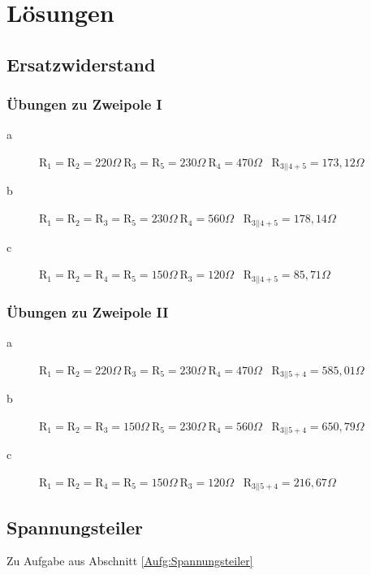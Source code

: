 \appendix
\section{Lösungen}
\subsection{Ersatzwiderstand}
\label{lsg:Ersatzwiderstand}
\subsubsection{Übungen zu Zweipole I}
\begin{description}
  \item[a] $\text{R}_1 = \text{R}_2 = 220 \Omega \ \text{R}_3 = \text{R}_5 = 230 \Omega \ \text{R}_4 = 470 \Omega$ \ $\text{R}_{3||4+5} = 173,12 \Omega$
  \item[b] $\text{R}_1 = \text{R}_2 = \text{R}_3 = \text{R}_5 = 230 \Omega \ \text{R}_4 = 560 \Omega$ \ $\text{R}_{3||4+5} = 178,14 \Omega$
  \item[c] $\text{R}_1 = \text{R}_2 = \text{R}_4 = \text{R}_5 = 150 \Omega \ \text{R}_3 = 120 \Omega$ \ $\text{R}_{3||4+5} = 85,71 \Omega$
\end{description}
\subsubsection{Übungen zu Zweipole II}
\begin{description}
  \item[a] $\text{R}_1 = \text{R}_2 = 220 \Omega \ \text{R}_3 = \text{R}_5 = 230 \Omega \ \text{R}_4 = 470 \Omega$ \ $\text{R}_{3||5+4} = 585,01 \Omega$
  \item[b] $\text{R}_1 = \text{R}_2 = \text{R}_3 = 150 \Omega \ \text{R}_5 = 230 \Omega \ \text{R}_4 = 560 \Omega$ \ $\text{R}_{3||5+4} =  650,79\Omega$
  \item[c] $\text{R}_1 = \text{R}_2 = \text{R}_4 = \text{R}_5 = 150 \Omega \ \text{R}_3 = 120 \Omega$ \ $\text{R}_{3||5+4} =  216,67\Omega$
\end{description}


\subsection{Spannungsteiler}
\label{Lsg:Spannungsteiler}
Zu Aufgabe aus Abschnitt \ref{Aufg:Spannungsteiler}

